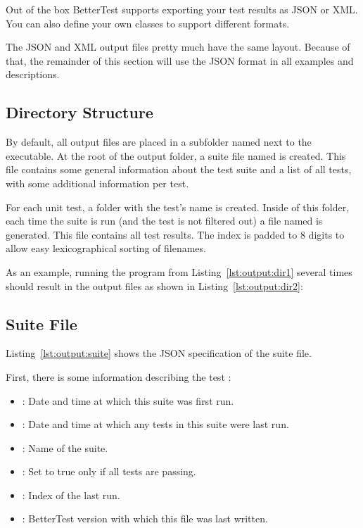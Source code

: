Out of the box BetterTest supports exporting your test results as JSON or XML. You can also define your own classes to support different formats.

The JSON and XML output files pretty much have the same layout. Because of that, the remainder of this section will use the JSON format in all examples and descriptions.

\subsection{Directory Structure}
\label{section:output:dir}

By default, all output files are placed in a subfolder named  next to the executable. At the root of the output folder, a suite file named  is created. This file contains some general information about the test suite and a list of all tests, with some additional information per test.

For each unit test, a folder with the test's name is created. Inside of this folder, each time the suite is run (and the test is not filtered out) a file named  is generated. This file contains all test results. The index is padded to 8 digits to allow easy lexicographical sorting of filenames.

As an example, running the program from Listing~\ref{lst:output:dir1} several times should result in the output files as shown in Listing~\ref{lst:output:dir2}:





\subsection{Suite File}
\label{section:output:suite}

Listing~\ref{lst:output:suite} shows the JSON specification of the suite file.

First, there is some information describing the test :

\begin{itemize}
\item {}: Date and time at which this suite was first run.
\item {}: Date and time at which any tests in this suite were last run.
\item {}: Name of the suite.
\item {}: Set to true only if all tests are passing.
\item {}: Index of the last run.
\item {}: BetterTest version with which this file was last written.
\end{itemize}

